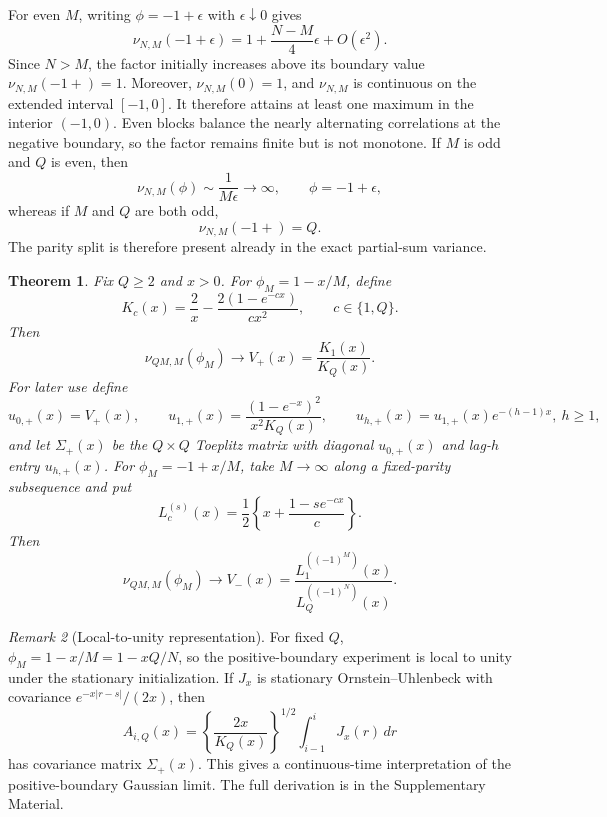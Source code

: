 \documentclass[12pt]{article}
\newtheorem{Theorem}{Theorem}[section]
\theoremstyle{remark}
\newtheorem{Remark}[Theorem]{Remark}
\begin{document}
For even $M$, writing $\phi=-1+\epsilon$ with $\epsilon\downarrow0$ gives
\begin{equation}
\nu_{N,M}(-1+\epsilon)
=
1+\frac{N-M}{4}\epsilon+O(\epsilon^2).
\label{eq:V-negative-even}
\end{equation}
Since $N>M$, the factor initially increases above its boundary value
$\nu_{N,M}(-1+)=1$. Moreover, $\nu_{N,M}(0)=1$, and
$\nu_{N,M}$ is continuous on the extended interval $[-1,0]$.
It therefore attains at least one maximum in the interior $(-1,0)$. Even blocks balance the nearly alternating correlations at the negative boundary, so the factor remains finite but is not monotone. If $M$ is odd and $Q$ is even, then
\begin{equation}
\nu_{N,M}(\phi)\sim\frac{1}{M\epsilon}\longrightarrow\infty,
\qquad \phi=-1+\epsilon,
\label{eq:V-negative-odd-evenQ}
\end{equation}
whereas if $M$ and $Q$ are both odd,
\begin{equation}
\nu_{N,M}(-1+)=Q.
\label{eq:V-negative-odd-oddQ}
\end{equation}
The parity split is therefore present already in the exact partial-sum variance.

\begin{Theorem}
\label{thm:correction-boundary-layers}
Fix $Q\ge2$ and $x>0$. For $\phi_M=1-x/M$, define
\[
K_c(x)=\frac{2}{x}-\frac{2(1-e^{-cx})}{cx^2},
\qquad c\in\{1,Q\}.
\]
Then
\begin{equation}
\nu_{QM,M}(\phi_M)\longrightarrow V_+(x)=\frac{K_1(x)}{K_Q(x)}.
\label{eq:Vplus-local}
\end{equation}
For later use define
\begin{equation}
u_{0,+}(x)=V_+(x),
\qquad
u_{1,+}(x)=\frac{(1-e^{-x})^2}{x^2K_Q(x)},
\qquad
u_{h,+}(x)=u_{1,+}(x)e^{-(h-1)x},\ h\ge1,
\label{eq:positive-boundary-cov-sequence}
\end{equation}
and let $\Sigma_+(x)$ be the $Q\times Q$ Toeplitz matrix with diagonal $u_{0,+}(x)$ and lag-$h$ entry $u_{h,+}(x)$. For $\phi_M=-1+x/M$, take $M\to\infty$ along a fixed-parity subsequence and put
\[
L_c^{(s)}(x)=\frac12\left\{x+\frac{1-se^{-cx}}{c}\right\}.
\]
Then
\begin{equation}
\nu_{QM,M}(\phi_M)
\longrightarrow
V_-(x)
=\frac{L_1^{((-1)^M)}(x)}{L_Q^{((-1)^N)}(x)}.
\label{eq:Vminus-local}
\end{equation}
\end{Theorem}

\begin{Remark}[Local-to-unity representation]
\label{rem:ou-positive-boundary}
For fixed $Q$, $\phi_M=1-x/M=1-xQ/N$, so the positive-boundary experiment is local to unity under the stationary initialization. If $J_x$ is stationary Ornstein--Uhlenbeck with covariance $e^{-x|r-s|}/(2x)$, then
\[
A_{i,Q}(x)=\left\{\frac{2x}{K_Q(x)}\right\}^{1/2}
\int_{i-1}^{i}J_x(r)\,dr
\]
has covariance matrix $\Sigma_+(x)$. This gives a continuous-time interpretation of the positive-boundary Gaussian limit. The full derivation is in the Supplementary Material.
\end{Remark}
\end{document}
